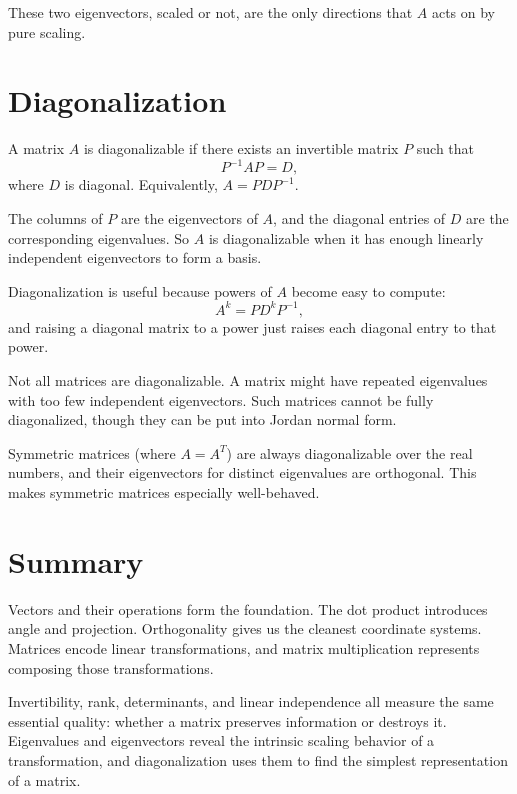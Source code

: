 \documentclass[11pt]{article}
\begin{document}
These two eigenvectors, scaled or not, are the only directions that $A$ acts on by pure scaling.

\section*{Diagonalization}

A matrix $A$ is diagonalizable if there exists an invertible matrix $P$ such that
\[
P^{-1} A P = D,
\]
where $D$ is diagonal. Equivalently, $A = P D P^{-1}$.

The columns of $P$ are the eigenvectors of $A$, and the diagonal entries of $D$ are the corresponding eigenvalues. So $A$ is diagonalizable when it has enough linearly independent eigenvectors to form a basis.

Diagonalization is useful because powers of $A$ become easy to compute:
\[
A^k = P D^k P^{-1},
\]
and raising a diagonal matrix to a power just raises each diagonal entry to that power.

Not all matrices are diagonalizable. A matrix might have repeated eigenvalues with too few independent eigenvectors. Such matrices cannot be fully diagonalized, though they can be put into Jordan normal form.

Symmetric matrices (where $A = A^T$) are always diagonalizable over the real numbers, and their eigenvectors for distinct eigenvalues are orthogonal. This makes symmetric matrices especially well-behaved.

\section*{Summary}

Vectors and their operations form the foundation. The dot product introduces angle and projection. Orthogonality gives us the cleanest coordinate systems. Matrices encode linear transformations, and matrix multiplication represents composing those transformations.

Invertibility, rank, determinants, and linear independence all measure the same essential quality: whether a matrix preserves information or destroys it. Eigenvalues and eigenvectors reveal the intrinsic scaling behavior of a transformation, and diagonalization uses them to find the simplest representation of a matrix.
\end{document}
